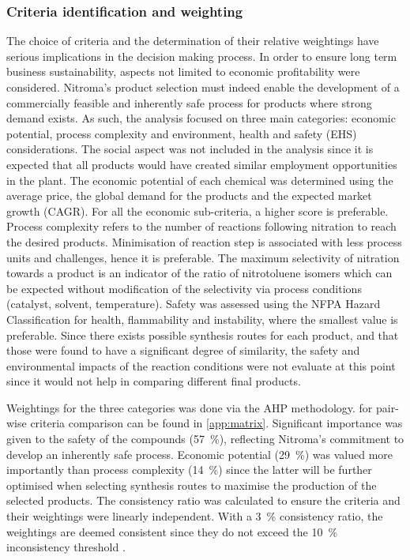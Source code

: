 \subsubsection{Criteria identification and weighting}

The choice of criteria and the determination of their relative weightings have serious implications in the decision making process. In order to ensure long term business sustainability, aspects not limited to economic profitability were considered. Nitroma's product selection must indeed enable the development of a commercially feasible and inherently safe process for products where strong demand exists. As such, the analysis focused on three main categories: economic potential, process complexity and environment, health and safety (EHS) considerations. The social aspect was not included in the analysis since it is expected that all products would have created similar employment opportunities in the plant. 
The economic potential of each chemical was determined using the average price, the global demand for the products and the expected market growth (CAGR). For all the economic sub-criteria, a higher score is preferable. Process complexity refers to the number of reactions following nitration to reach the desired products. Minimisation of reaction step is associated with less process units and challenges, hence it is preferable. The maximum selectivity of nitration towards a product is an indicator of the ratio of nitrotoluene isomers which can be expected without modification of the selectivity via process conditions (catalyst, solvent, temperature). Safety was assessed using the NFPA Hazard Classification for health, flammability and instability, where the smallest value is preferable. Since there exists possible synthesis routes for each product, and that those were found to have a significant degree of similarity, the safety and environmental impacts of the reaction conditions were not evaluate at this point since it would not help in comparing different final products. 

Weightings for the three categories was done via the AHP methodology.  for pair-wise criteria comparison can be found in \cref{app:matrix}. Significant importance was given to the safety of the compounds (\SI{57}{\percent}), reflecting Nitroma's commitment to develop an inherently safe process. Economic potential (\SI{29}{\percent}) was valued more importantly than process complexity (\SI{14}{\percent}) since the latter will be further optimised when selecting synthesis routes to maximise the production of the selected products. The consistency ratio was calculated to ensure the criteria and their weightings were linearly independent. With a \SI{3}{\percent} consistency ratio, the weightings are deemed consistent since they do not exceed the \SI{10}{\percent} inconsistency threshold \cite{saaty_analytic_1987}.


